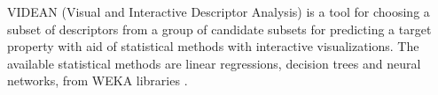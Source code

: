 VIDEAN (Visual and Interactive Descriptor Analysis) is a tool for choosing a subset of descriptors from a group of candidate subsets for predicting a target property with aid of statistical methods with interactive visualizations. The available statistical methods are linear regressions, decision trees and neural networks, from WEKA libraries \cite{Mart_nez_2015}.